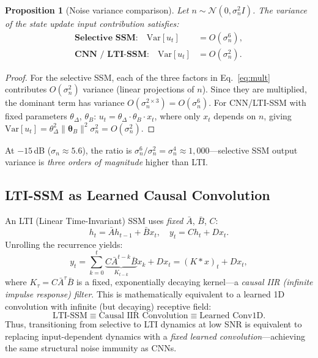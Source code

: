 \documentclass{Interspeech}
\newtheorem{proposition}{Proposition}
\begin{document}
\begin{proposition}[Noise variance comparison]
\label{prop:variance}
Let $n \sim \mathcal{N}(0, \sigma_n^2 I)$. The variance of the state update input contribution satisfies:
\begin{align}
\textbf{Selective SSM:} \quad \mathrm{Var}[u_t] &= O(\sigma_n^6), \label{eq:var_ssm} \\
\textbf{CNN / LTI-SSM:} \quad \mathrm{Var}[u_t] &= O(\sigma_n^2). \label{eq:var_cnn}
\end{align}
\end{proposition}
\begin{proof}
For the selective SSM, each of the three factors in Eq.~\ref{eq:mult} contributes $O(\sigma_n^2)$ variance (linear projections of $n$). Since they are multiplied, the dominant term has variance $O(\sigma_n^{2 \times 3}) = O(\sigma_n^6)$.
For CNN/LTI-SSM with fixed parameters $\theta_\Delta$, $\theta_B$: $u_t = \theta_\Delta \cdot \theta_B \cdot x_t$, where only $x_t$ depends on $n$, giving $\mathrm{Var}[u_t] = \theta_\Delta^2 \lVert\bm{\theta}_B\rVert^2 \sigma_n^2 = O(\sigma_n^2)$.
\end{proof}

\smallskip
At $-15$\,dB ($\sigma_n \approx 5.6$), the ratio is $\sigma_n^6 / \sigma_n^2 = \sigma_n^4 \approx 1{,}000$---selective SSM output variance is \emph{three orders of magnitude} higher than LTI.

\subsection{LTI-SSM as Learned Causal Convolution}
\label{sec:lti}

An LTI (Linear Time-Invariant) SSM uses \emph{fixed} $\bar{A}$, $\bar{B}$, $C$:
\begin{equation}
h_t = \bar{A} h_{t-1} + \bar{B} x_t, \quad y_t = C h_t + D x_t.
\end{equation}
Unrolling the recurrence yields:
\begin{equation}
y_t = \sum_{k=0}^{t} \underbrace{C \bar{A}^{t-k} \bar{B}}_{K_{t-k}} x_k + D x_t = (K \ast x)_t + D x_t,
\label{eq:conv}
\end{equation}
where $K_\tau = C \bar{A}^\tau \bar{B}$ is a fixed, exponentially decaying kernel---a \emph{causal IIR (infinite impulse response) filter}.
This is mathematically equivalent to a learned 1D convolution with infinite (but decaying) receptive field:
\begin{equation}
\boxed{\text{LTI-SSM} \equiv \text{Causal IIR Convolution} \equiv \text{Learned Conv1D}.}
\label{eq:equivalence}
\end{equation}
Thus, transitioning from selective to LTI dynamics at low SNR is equivalent to replacing input-dependent dynamics with a \emph{fixed learned convolution}---achieving the same structural noise immunity as CNNs.
\end{document}
